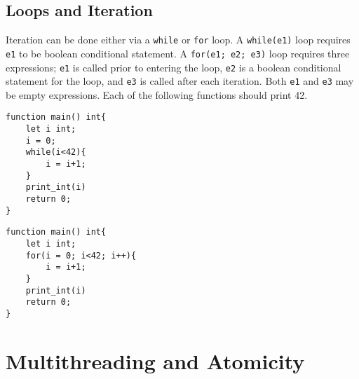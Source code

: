 	\subsection{Loops and Iteration}
		Iteration can be done either via a \texttt{while} or \texttt{for} loop. A \texttt{while(e1)} loop requires \texttt{e1} to be boolean conditional statement. A \texttt{for(e1; e2; e3)} loop requires three expressions; \texttt{e1} is called prior to entering the loop, \texttt{e2} is a boolean conditional statement for the loop, and \texttt{e3} is called after each iteration. Both \texttt{e1} and \texttt{e3} may be empty expressions. Each of the following functions should print 42.

		\begin{lstlisting}
function main() int{
	let i int;
	i = 0;
	while(i<42){
		i = i+1;
	}
	print_int(i)
	return 0;
}
		\end{lstlisting}

		\begin{lstlisting}
function main() int{
	let i int;
	for(i = 0; i<42; i++){
		i = i+1;
	}
	print_int(i)
	return 0;
}
		\end{lstlisting}



\section{Multithreading and Atomicity}

